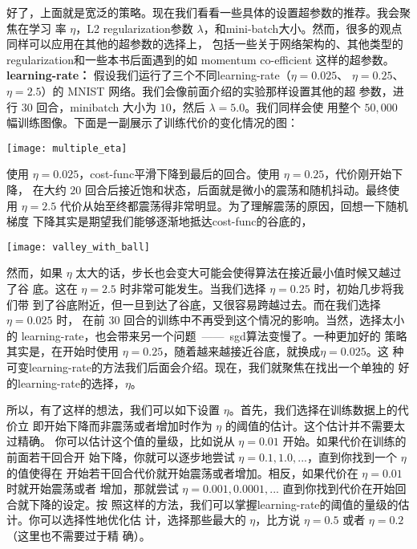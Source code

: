 好了，上面就是宽泛的策略。现在我们看看一些具体的设置超参数的推荐。我会聚焦在学习
率 $\eta$，L2 \gls*{regularization}参数
$\lambda$，和\gls*{mini-batch}大小。然而，很多的观点同样可以应用在其他的超参数的选择上，
包括一些关于网络架构的、其他类型的\gls*{regularization}和一些本书后面遇到的如 momentum
co-efficient 这样的超参数。\\

\textbf{\gls*{learning-rate}：} 假设我们运行了三个不同\gls*{learning-rate}（$\eta=0.025$、
  $\eta=0.25$、$\eta=2.5$）的 MNIST 网络。我们会像前面介绍的实验那样设置其他的超
参数，进行 $30$ 回合，minibatch 大小为 $10$，然后 $\lambda = 5.0$。我们同样会使
用整个 $50,000$ 幅训练图像。下面是一副展示了训练代价的变化情况的图：
\begin{center}
  \texttt{[image: multiple\_eta]}
\end{center}

使用 $\eta=0.025$，\gls*{cost-func}平滑下降到最后的回合。使用 $\eta=0.25$，代价刚开始下降，
在大约 $20$ 回合后接近饱和状态，后面就是微小的震荡和随机抖动。最终使
用 $\eta=2.5$ 代价从始至终都震荡得非常明显。为了理解震荡的原因，回想一下随机梯度
下降其实是期望我们能够逐渐地抵达\gls*{cost-func}的谷底的，
\begin{center}
  \texttt{[image: valley\_with\_ball]}
\end{center}
然而，如果 $\eta$ 太大的话，步长也会变大可能会使得算法在接近最小值时候又越过了谷
底。这在 $\eta=2.5$ 时非常可能发生。当我们选择 $\eta=0.25$ 时，初始几步将我们带
到了谷底附近，但一旦到达了谷底，又很容易跨越过去。而在我们选择 $\eta=0.025$ 时，
在前 $30$ 回合的训练中不再受到这个情况的影响。当然，选择太小的%
\gls*{learning-rate}，也会带来另一个问题~——~\gls*{sgd}算法变慢了。一种更加好的
策略其实是，在开始时使用 $\eta=0.25$，随着越来越接近谷底，就换成$\eta=0.025$。这
种可变\gls*{learning-rate}的方法我们后面会介绍。现在，我们就聚焦在找出一个单独的
好的\gls*{learning-rate}的选择，$\eta$。

所以，有了这样的想法，我们可以如下设置 $\eta$。首先，我们选择在训练数据上的代价立
即开始下降而非震荡或者增加时作为 $\eta$ 的阈值的估计。这个估计并不需要太过精确。
你可以估计这个值的量级，比如说从 $\eta=0.01$ 开始。如果代价在训练的前面若干回合开
始下降，你就可以逐步地尝试 $\eta=0.1, 1.0,...$，直到你找到一个 $\eta$ 的值使得在
开始若干回合代价就开始震荡或者增加。相反，如果代价在 $\eta=0.01$ 时就开始震荡或者
增加，那就尝试 $\eta=0.001, 0.0001,...$ 直到你找到代价在开始回合就下降的设定。按
照这样的方法，我们可以掌握\gls*{learning-rate}的阈值的量级的估计。你可以选择性地优化估
计，选择那些最大的 $\eta$，比方说 $\eta=0.5$ 或者 $\eta=0.2$（这里也不需要过于精
确）。

